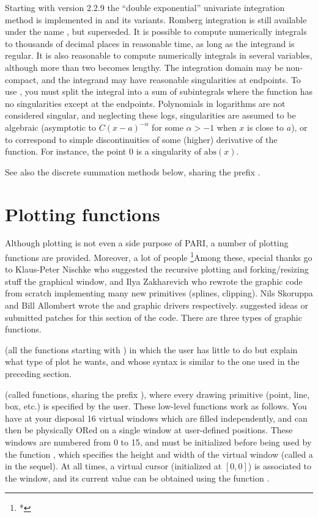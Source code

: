 Starting with version 2.2.9 the ``double exponential'' univariate
integration method is implemented in  and its variants. Romberg
integration is still available under the name , but
superseded. It is possible to compute numerically integrals to thousands of
decimal places in reasonable time, as long as the integrand is regular. It is
also reasonable to compute numerically integrals in several variables,
although more than two becomes lengthy. The integration domain may be
non-compact, and the integrand may have reasonable singularities at
endpoints. To use , you must split the integral into a sum
of subintegrals where the function has no singularities except at the
endpoints. Polynomials in logarithms are not considered singular, and
neglecting these logs, singularities are assumed to be algebraic (asymptotic
to $C(x-a)^{-\alpha}$ for some $\alpha > -1$ when $x$ is
close to $a$), or to correspond to simple discontinuities of some (higher)
derivative of the function. For instance, the point $0$ is a singularity of
$\text{abs}(x)$.

See also the discrete summation methods below, sharing the prefix .


\section{Plotting functions}

  Although plotting is not even a side purpose of PARI, a number of plotting
functions are provided. Moreover, a lot of people
\footnote{*}{Among these, special thanks go to Klaus-Peter Nischke who
suggested the recursive plotting and forking/resizing stuff the graphical
window, and Ilya Zakharevich who rewrote the graphic code from scratch
implementing many new primitives (splines, clipping). Nils Skoruppa and Bill
Allombert wrote the  and  graphic drivers respectively.}
suggested ideas or submitted patches for this section of the code. There are
three types of graphic functions.

 (all the functions starting with
) in which the user has little to do but explain what type of plot
he wants, and whose syntax is similar to the one used in the preceding
section.

 (called  functions,
sharing the prefix ), where every drawing primitive (point, line,
box, etc.) is specified by the user. These low-level functions work as
follows. You have at your disposal 16 virtual windows which are filled
independently, and can then be physically ORed on a single window at
user-defined positions. These windows are numbered from 0 to 15, and must be
initialized before being used by the function , which specifies
the height and width of the virtual window (called a  in the
sequel). At all times, a virtual cursor (initialized at $[0,0]$) is associated
to the window, and its current value can be obtained using the function
.

